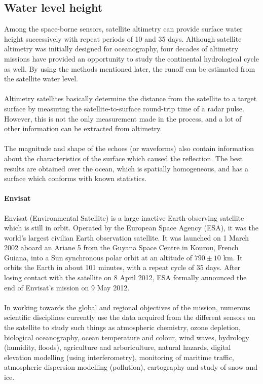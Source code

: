 \subsection{Water level height}
 Among the space-borne sensors, satellite altimetry can provide surface water height successively with repeat periods of 10 and 35 days. Although satellite altimetry was initially designed for oceanography, four decades of altimetry missions have provided an opportunity to study the continental hydrological cycle as well. By using the methods mentioned later, the runoff can be estimated from the satellite water level.\\\\
 Altimetry satellites basically determine the distance from the satellite to a target surface by measuring the satellite-to-surface round-trip time of a radar pulse. However, this is not the only measurement made in the process, and a lot of other information can be extracted from altimetry.\\\\
 The magnitude and shape of the echoes (or waveforms) also contain information about the characteristics of the surface which caused the reflection. The best results are obtained over the ocean, which is spatially homogeneous, and has a surface which conforms with known statistics.
 \paragraph{Envisat}
Envisat (Environmental Satellite) is a large inactive Earth-observing satellite which is still in orbit. Operated by the European Space Agency (ESA), it was the world's largest civilian Earth observation satellite. It was launched on 1 March 2002 aboard an Ariane 5 from the Guyana Space Centre in Kourou, French Guiana, into a Sun synchronous polar orbit at an altitude of $790\pm10$ km. It orbits the Earth in about 101 minutes, with a repeat cycle of 35 days. After losing contact with the satellite on 8 April 2012, ESA formally announced the end of Envisat's mission on 9 May 2012.\\\\
In working towards the global and regional objectives of the mission, numerous scientific disciplines currently use the data acquired from the different sensors on the satellite to study such things as atmospheric chemistry, ozone depletion, biological oceanography, ocean temperature and colour, wind waves, hydrology (humidity, floods), agriculture and arboriculture, natural hazards, digital elevation modelling (using interferometry), monitoring of maritime traffic, atmospheric dispersion modelling (pollution), cartography and study of snow and ice.
